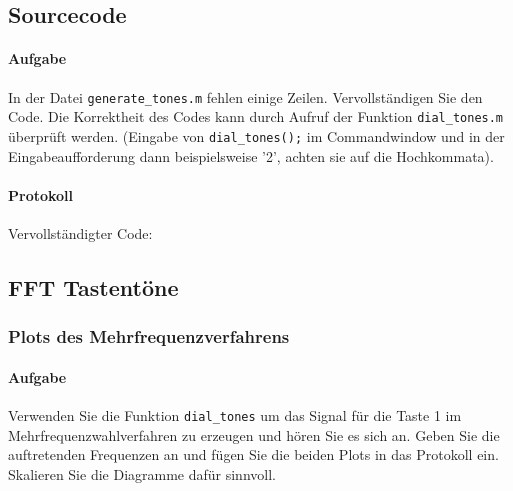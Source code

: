 \documentclass[10pt]{report}
\begin{document}
        \subsection{Sourcecode}
        \paragraph{Aufgabe}
        In der Datei \texttt{generate\_tones.m} fehlen einige Zeilen. Vervollständigen Sie den Code. Die
        Korrektheit des Codes kann durch Aufruf der Funktion \texttt{dial\_tones.m} überprüft werden.
        (Eingabe von \texttt{dial\_tones();} im Commandwindow und in der Eingabeaufforderung dann
        beispielsweise ’2’, achten sie auf die Hochkommata).
        \paragraph{Protokoll}
        Vervollständigter Code:
        

        \vspace{2cm}

        

        \subsection{FFT Tastentöne}
        \subsubsection{Plots des Mehrfrequenzverfahrens}
        \paragraph{Aufgabe}
        Verwenden Sie die Funktion \texttt{dial\_tones} um das Signal für die Taste
        \glqq{}1\grqq{} im Mehrfrequenzwahlverfahren
        zu erzeugen und hören Sie es sich an. Geben Sie die auftretenden
        Frequenzen an und fügen Sie die beiden Plots in das Protokoll ein. Skalieren
        Sie die Diagramme dafür sinnvoll.
\end{document}
